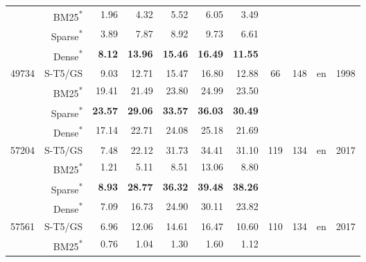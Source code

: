 \documentclass[11pt]{article}
\begin{document}
\begin{table*}[]
\begin{tabular}{l|r|r|r|r|r|r|c|c|c|c}
     &    BM25\textsuperscript{*} &   1.96 &   4.32 &    5.52 &    6.05 &         3.49 &        &     &         &           \\
     &    Sparse\textsuperscript{*} &   3.89 &   7.87 &    8.92 &    9.73 &         6.61 &        &     &         &           \\
     &    Dense\textsuperscript{*} &   \textbf{8.12} &  \textbf{13.96} &   \textbf{15.46} &   \textbf{16.49} &        \textbf{11.55} &        &     &         &           \\
    \hline
    \multirow{4}{3em}{49734} &    S-T5/GS &   9.03 &  12.71 &   15.47 &   16.80 &        12.88 &       \multirow{4}{2em}{66} &    \multirow{4}{1em}{148} &        \multirow{4}{1em}{en} &            \multirow{4}{2em}{1998} \\
     &    BM25\textsuperscript{*} &  19.41 &  21.49 &   23.80 &   24.99 &        23.50 &        &     &         &           \\
     &    Sparse\textsuperscript{*} &  \textbf{23.57} &  \textbf{29.06} &   \textbf{33.57} &   \textbf{36.03} &        \textbf{30.49} &        &     &         &           \\
     &    Dense\textsuperscript{*} &  17.14 &  22.71 &   24.08 &   25.18 &        21.69 &        &     &         &           \\
    \hline
    \multirow{4}{3em}{57204} &    S-T5/GS &   7.48 &  22.12 &   31.73 &   34.41 &        31.10 &      \multirow{4}{2em}{119} &    \multirow{4}{1em}{134} &        \multirow{4}{1em}{en} &            \multirow{4}{2em}{2017} \\
     &    BM25\textsuperscript{*} &   1.21 &   5.11 &    8.51 &   13.06 &         8.80 &       &     &         &           \\
     &    Sparse\textsuperscript{*} &   \textbf{8.93} &  \textbf{28.77} &   \textbf{36.32} &   \textbf{39.48} &        \textbf{38.26} &       &     &         &           \\
     &    Dense\textsuperscript{*} &   7.09 &  16.73 &   24.90 &   30.11 &        23.82 &       &     &         &           \\
    \hline
    \multirow{4}{3em}{57561} &    S-T5/GS &   6.96 &  12.06 &   14.61 &   16.47 &        10.60 &      \multirow{4}{2em}{110} &    \multirow{4}{1em}{134} &        \multirow{4}{1em}{en} &            \multirow{4}{2em}{2017} \\
     &    BM25\textsuperscript{*} &   0.76 &   1.04 &    1.30 &    1.60 &         1.12 &       &     &         &           \\

\end{tabular}
\end{table*}
\end{document}
